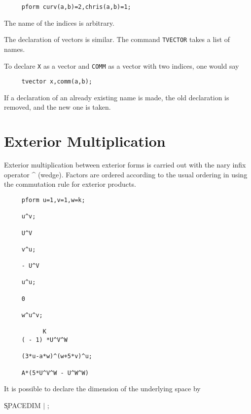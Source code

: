 \begin{verbatim}
     pform curv(a,b)=2,chris(a,b)=1;
\end{verbatim}

The name of the indices is arbitrary.

The declaration of vectors is similar. The command {\tt TVECTOR}\label{TVECTOR}
takes a list of names.  

\example{}

To declare {\tt X} as a vector and {\tt COMM} as a vector with two
indices, one would say

\begin{verbatim}
     tvector x,comm(a,b);
\end{verbatim}

If a declaration of an already existing name is made, the old
declaration is removed, and the new one is taken.


\section{Exterior Multiplication}

 
Exterior multiplication between exterior forms is carried out with the
nary infix operator \^{ } (wedge)\label{wedge}.  Factors are ordered
according to the usual ordering in {\REDUCE} using the commutation
rule for exterior products.

\example{}

\begin{verbatim}
     pform u=1,v=1,w=k;

     u^v;

     U^V

     v^u;

     - U^V

     u^u;

     0

     w^u^v;

           K
     ( - 1) *U^V^W

     (3*u-a*w)^(w+5*v)^u;

     A*(5*U^V^W - U^W^W)
\end{verbatim}

It is possible to declare the dimension of the underlying space
by\label{SPACEDIM}  

\hspace*{2em} \k{SPACEDIM}  $\mid$ ;

